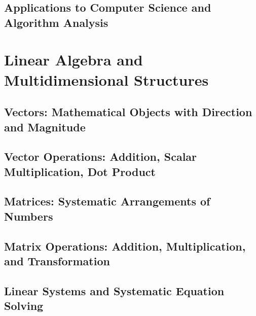 \documentclass[12pt, oneside, openany]{book}
\begin{document}
\section{Applications to Computer Science and Algorithm Analysis}


\chapter{Linear Algebra and Multidimensional Structures}

\section{Vectors: Mathematical Objects with Direction and Magnitude}

\section{Vector Operations: Addition, Scalar Multiplication, Dot Product}

\section{Matrices: Systematic Arrangements of Numbers}

\section{Matrix Operations: Addition, Multiplication, and Transformation}

\section{Linear Systems and Systematic Equation Solving}
\end{document}
